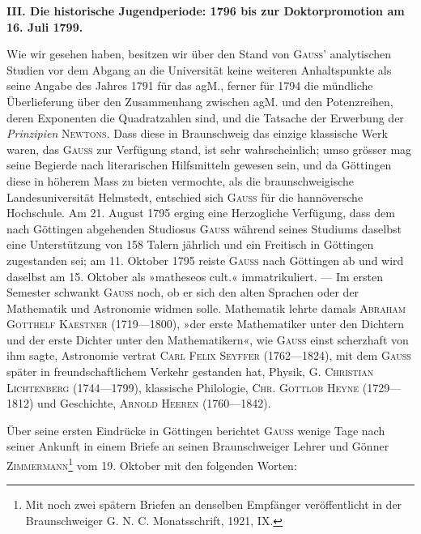 \bigskip
\begin{center}\bfseries
III. Die historische Jugendperiode: 1796 bis zur Doktorpromotion am 16. Juli 1799.
\end{center}
\begin{center}\end{center}
\indent Wie wir gesehen haben, besitzen wir über den Stand von \textsc{Gauss}’
analytischen Studien vor dem Abgang an die Universität keine weiteren Anhaltspunkte
als seine Angabe des Jahres 1791 für das agM., ferner für 1794 die
mündliche Überlieferung über den Zusammenhang zwischen agM. und den
Potenzreihen, deren Exponenten die Quadratzahlen sind, und die Tatsache der
Erwerbung der \textit{Prinzipien} \textsc{Newtons}. Dass diese in Braunschweig das einzige
klassische Werk waren, das \textsc{Gauss} zur Verfügung stand, ist sehr wahrscheinlich;
umso grösser mag seine Begierde nach literarischen Hilfsmitteln gewesen
sein, und da Göttingen diese in höherem Mass zu bieten vermochte, als die
braunschweigische Landesuniversität Helmstedt, entschied sich \textsc{Gauss} für die
hannöversche Hochschule. Am 21. August 1795 erging eine Herzogliche Verfügung,
dass dem nach Göttingen abgehenden Studiosus \textsc{Gauss} während seines
Studiums daselbst eine Unterstützung von 158 Talern jährlich und ein Freitisch
in Göttingen zugestanden sei; am 11. Oktober 1795 reiste \textsc{Gauss} nach
Göttingen ab und wird daselbst am 15. Oktober als »matheseos cult.« immatrikuliert.
— Im ersten Semester schwankt \textsc{Gauss} noch, ob er sich den alten
Sprachen oder der Mathematik und Astronomie widmen solle. Mathematik
lehrte damals \textsc{Abraham Gotthelf Kaestner} (1719—1800), »der erste Mathematiker
unter den Dichtern und der erste Dichter unter den Mathematikern«,
wie \textsc{Gauss} einst scherzhaft von ihm sagte, Astronomie vertrat \textsc{Carl Felix
Seyffer} (1762—1824), mit dem \textsc{Gauss} später in freundschaftlichem Verkehr
gestanden hat, Physik, \textsc{G. Christian Lichtenberg} (1744—1799), klassische
Philologie, \textsc{Chr. Gottlob Heyne} (1729—1812) und Geschichte, \textsc{Arnold Heeren}
(1760—1842).

\clearpage{}
Über seine ersten Eindrücke in Göttingen berichtet \textsc{Gauss} wenige Tage
nach seiner Ankunft in einem Briefe an seinen Braunschweiger Lehrer und
Gönner \textsc{Zimmermann}\footnote{Mit noch zwei spätern Briefen an denselben Empfänger veröffentlicht in der Braunschweiger G. N. C. Monatsschrift, 1921, IX.} vom 19. Oktober mit den folgenden Worten:

